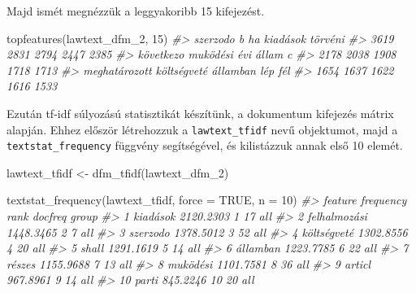\documentclass[
]{book}
\newenvironment{Shaded}{\begin{snugshade}}{\end{snugshade}}
\newcommand{\AttributeTok}[1]{\textcolor[rgb]{0.77,0.63,0.00}{#1}}
\newcommand{\CommentTok}[1]{\textcolor[rgb]{0.56,0.35,0.01}{\textit{#1}}}
\newcommand{\ConstantTok}[1]{\textcolor[rgb]{0.00,0.00,0.00}{#1}}
\newcommand{\DecValTok}[1]{\textcolor[rgb]{0.00,0.00,0.81}{#1}}
\newcommand{\FunctionTok}[1]{\textcolor[rgb]{0.00,0.00,0.00}{#1}}
\newcommand{\NormalTok}[1]{#1}
\newcommand{\OtherTok}[1]{\textcolor[rgb]{0.56,0.35,0.01}{#1}}
\begin{document}
Majd ismét megnézzük a leggyakoribb 15 kifejezést.

\begin{Shaded}
\begin{Highlighting}[]

\FunctionTok{topfeatures}\NormalTok{(lawtext\_dfm\_2, }\DecValTok{15}\NormalTok{)}
\CommentTok{\#\textgreater{}      szerzodo             b            ha      kiadások       törvéni }
\CommentTok{\#\textgreater{}          3619          2831          2794          2447          2385 }
\CommentTok{\#\textgreater{}     következo      muködési           évi         állam             c }
\CommentTok{\#\textgreater{}          2178          2038          1908          1718          1713 }
\CommentTok{\#\textgreater{} meghatározott   költségveté      államban           lép           fél }
\CommentTok{\#\textgreater{}          1654          1637          1622          1616          1533}
\end{Highlighting}
\end{Shaded}

Ezután tf-idf súlyozású statisztikát készítünk, a dokumentum kifejezés
mátrix alapján. Ehhez először létrehozzuk a \texttt{lawtext\_tfidf} nevű
objektumot, majd a \texttt{textstat\_frequency} függvény segítségével,
és kilistázzuk annak első 10 elemét.

\begin{Shaded}
\begin{Highlighting}[]
\NormalTok{lawtext\_tfidf }\OtherTok{\textless{}{-}} \FunctionTok{dfm\_tfidf}\NormalTok{(lawtext\_dfm\_2)}

\FunctionTok{textstat\_frequency}\NormalTok{(lawtext\_tfidf, }\AttributeTok{force =} \ConstantTok{TRUE}\NormalTok{, }\AttributeTok{n =} \DecValTok{10}\NormalTok{)}
\CommentTok{\#\textgreater{}         feature frequency rank docfreq group}
\CommentTok{\#\textgreater{} 1      kiadások 2120.2303    1      17   all}
\CommentTok{\#\textgreater{} 2  felhalmozási 1448.3465    2       7   all}
\CommentTok{\#\textgreater{} 3      szerzodo 1378.5012    3      52   all}
\CommentTok{\#\textgreater{} 4   költségveté 1302.8556    4      20   all}
\CommentTok{\#\textgreater{} 5         shall 1291.1619    5      14   all}
\CommentTok{\#\textgreater{} 6      államban 1223.7785    6      22   all}
\CommentTok{\#\textgreater{} 7        részes 1155.9688    7      13   all}
\CommentTok{\#\textgreater{} 8      muködési 1101.7581    8      36   all}
\CommentTok{\#\textgreater{} 9        articl  967.8961    9      14   all}
\CommentTok{\#\textgreater{} 10        parti  845.2246   10      20   all}
\end{Highlighting}
\end{Shaded}
\end{document}
